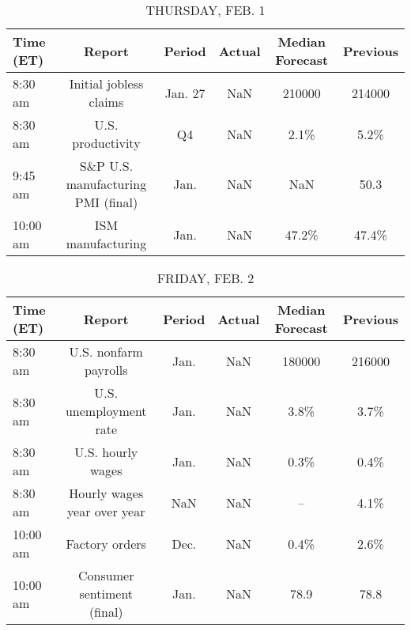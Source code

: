 \documentclass{article}%
\begin{document}
%


\begin{table}[htbp]%
\caption{THURSDAY, FEB. 1}%
\centering%
\begin{adjustbox}{width=1\textwidth}%
\begin{tabular}{lccccc}
\toprule
Time (ET) &                             Report &  Period & Actual & Median Forecast & Previous \\
\midrule
  8:30 am &             Initial jobless claims & Jan. 27 &    NaN &          210000 &   214000 \\
  8:30 am &                  U.S. productivity &      Q4 &    NaN &            2.1\% &     5.2\% \\
  9:45 am & S\&P U.S. manufacturing PMI (final) &    Jan. &    NaN &             NaN &     50.3 \\
 10:00 am &                  ISM manufacturing &    Jan. &    NaN &           47.2\% &    47.4\% \\
\bottomrule
\end{tabular}
%
\end{adjustbox}%
\end{table}

%


\begin{table}[htbp]%
\caption{FRIDAY, FEB. 2}%
\centering%
\begin{adjustbox}{width=1\textwidth}%
\begin{tabular}{lccccc}
\toprule
Time (ET) &                      Report & Period & Actual & Median Forecast & Previous \\
\midrule
  8:30 am &       U.S. nonfarm payrolls &   Jan. &    NaN &          180000 &   216000 \\
  8:30 am &      U.S. unemployment rate &   Jan. &    NaN &            3.8\% &     3.7\% \\
  8:30 am &           U.S. hourly wages &   Jan. &    NaN &            0.3\% &     0.4\% \\
  8:30 am & Hourly wages year over year &    NaN &    NaN &              -- &     4.1\% \\
 10:00 am &              Factory orders &   Dec. &    NaN &            0.4\% &     2.6\% \\
 10:00 am &  Consumer sentiment (final) &   Jan. &    NaN &            78.9 &     78.8 \\
\bottomrule
\end{tabular}
%
\end{adjustbox}%
\end{table}
\end{document}
